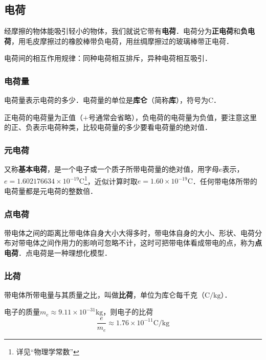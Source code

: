 
\subsection{电荷}

经摩擦的物体能吸引轻小的物体，我们就说它带有\textbf{电荷}．电荷分为\textbf{正电荷}和\textbf{负电荷}，用毛皮摩擦过的橡胶棒带负电荷，用丝绸摩擦过的玻璃棒带正电荷．

电荷间的相互作用规律：同种电荷相互排斥，异种电荷相互吸引．

\subsubsection{电荷量}

电荷量表示电荷的多少．电荷量的单位是\textbf{库仑}（简称\textbf{库}），符号为$\mathrm{C}$．

正电荷的电荷量为正值（$+$号通常会省略），负电荷的电荷量为负值，要注意这里的正、负表示电荷种类，比较电荷量的多少要看电荷量的绝对值．

\subsubsection{元电荷}

又称\textbf{基本电荷}，是一个电子或一个质子所带电荷量的绝对值，用字母$e$表示，$e = 1.602176634 \times 10^{-19} \mathrm{C}$\footnote{详见“物理学常数”}，近似计算时取$e = 1.60 \times 10^{-19} \mathrm{C}$．任何带电体所带的电荷量都是元电荷的整数倍．

\subsubsection{点电荷}

带电体之间的距离比带电体自身大小大得多时，带电体自身的大小、形状、电荷分布对带电体之间作用力的影响可忽略不计，这时可把带电体看成带电的点，称为\textbf{点电荷}．点电荷是一种理想化模型．

\subsubsection{比荷}

带电体所带电量与其质量之比，叫做\textbf{比荷}，单位为库仑每千克（$\mathrm{C/kg}$）．

电子的质量$m_e \approx 9.11 \times 10^{-31} \mathrm{kg}$，则电子的比荷
\begin{equation}
\frac{e}{m_e} \approx 1.76 \times 10^{-11} \mathrm{C/kg}
\end{equation}


